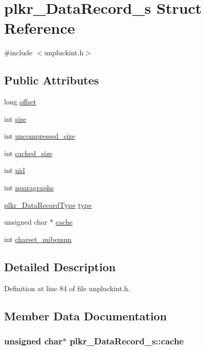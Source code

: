 \hypertarget{structplkr__DataRecord__s}{\section{plkr\+\_\+\+Data\+Record\+\_\+s Struct Reference}
\label{structplkr__DataRecord__s}
}


{\ttfamily \#include $<$unpluckint.\+h$>$}

\subsection*{Public Attributes}
\begin{DoxyCompactItemize}
\item 
long \hyperlink{structplkr__DataRecord__s_a913726cb8132eca067843510b8ff0b95}{offset}
\item 
int \hyperlink{structplkr__DataRecord__s_ac15867fee863318b96e3f9d27a1784e6}{size}
\item 
int \hyperlink{structplkr__DataRecord__s_a5c602d9d4b060310b9d1eda5bac08f59}{uncompressed\+\_\+size}
\item 
int \hyperlink{structplkr__DataRecord__s_a78134dc5aa0e23c86e5299ea6ca9f4b2}{cached\+\_\+size}
\item 
int \hyperlink{structplkr__DataRecord__s_afd7b53eef587427617f90ec51d69fbeb}{uid}
\item 
int \hyperlink{structplkr__DataRecord__s_a13979f89593b2b7c5eff61004025cacd}{nparagraphs}
\item 
\hyperlink{unpluck_8h_a2d3cdee2c160741b8a217b97e14b08b4}{plkr\+\_\+\+Data\+Record\+Type} \hyperlink{structplkr__DataRecord__s_a75431a1f26dc15418437086487724ff6}{type}
\item 
unsigned char $\ast$ \hyperlink{structplkr__DataRecord__s_af2a33cffa3aff9f346678b89727beb52}{cache}
\item 
int \hyperlink{structplkr__DataRecord__s_aeb1516d92695e1a446bef9e5385a0b72}{charset\+\_\+mibenum}
\end{DoxyCompactItemize}


\subsection{Detailed Description}


Definition at line 84 of file unpluckint.\+h.



\subsection{Member Data Documentation}
\hypertarget{structplkr__DataRecord__s_af2a33cffa3aff9f346678b89727beb52}{
\subsubsection[{cache}]{\setlength{\rightskip}{0pt plus 5cm}unsigned char$\ast$ plkr\+\_\+\+Data\+Record\+\_\+s\+::cache}}\label{structplkr__DataRecord__s_af2a33cffa3aff9f346678b89727beb52}


